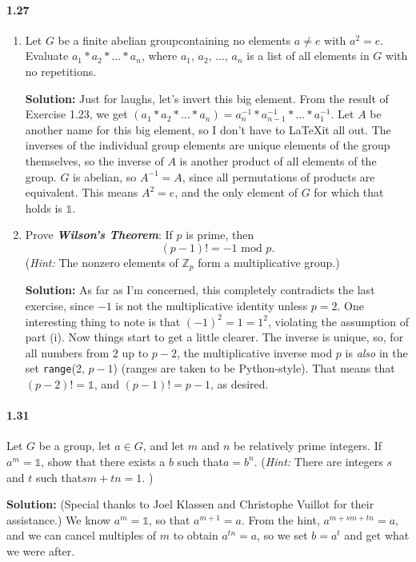 \documentclass[12pt,a4paper]{article}
\providecommand{\id}{\mathbb{1}}
\providecommand{\FAG}{finite abelian group}
\providecommand{\bemph}[1]{\emph{\textbf{#1}}}
\providecommand{\hint}{\emph{Hint: }}
\providecommand{\soln}{\textbf{Solution: }}
\providecommand{\st}{such that\xspace}
\providecommand{\JK}{Joel Klassen\xspace}
\providecommand{\CV}{Christophe Vuillot\xspace}
\providecommand{\inv}{^{-1}}
\providecommand{\mod}{\textrm{ mod }}
\begin{document}
\paragraph{1.27}
\begin{enumerate}[label=(\roman*)]
\item Let $G$ be a \FAG containing no elements $a \neq e$ with $a^2 = e$. 
Evaluate $a_1 \ast a_2 \ast \ldots \ast a_n$, where $a_1,\, a_2,\, \ldots, \, a_n$ is a list of all elements in $G$ with no repetitions.

\soln Just for laughs, let's invert this big element.
From the result of Exercise 1.23, we get $(a_1 \ast a_2 \ast \ldots \ast a_n) = a_n\inv \ast a_{n-1}\inv \ast \ldots \ast a_1\inv$.
Let $A$ be another name for this big element, so I don't have to \LaTeX it all out. 
The inverses of the individual group elements are unique elements of the group themselves, so the inverse of $A$ is another product of all elements of the group. 
$G$ is abelian, so $A\inv = A$, since all permutations of products are equivalent.
This means $A^2=e$, and the only element of $G$ for which that holds is $\id$.
\item Prove \bemph{Wilson's Theorem}: If $p$ is prime, then
\begin{equation*}
(p-1)! = -1 \mod p.
\end{equation*}
(\hint The nonzero elements of $\mathbb{Z}_p$ form a multiplicative group.)

\soln As far as I'm concerned, this completely contradicts the last exercise, since $-1$ is not the multiplicative identity unless $p=2$. 
One interesting thing to note is that $(-1)^2 = 1 = 1^2$, violating the assumption of part (i).
Now things start to get a little clearer. The inverse is unique, so, for all numbers from $2$ up to $p-2$, the multiplicative inverse mod $p$ is \emph{also} in the set \texttt{range}(2, $p-1$) (ranges are taken to be Python-style). 
That means that $(p-2)! = \id$, and $(p-1)! = p-1$, as desired.
\end{enumerate}

\paragraph*{1.31}
Let $G$ be a group, let $a \in G$, and let $m$ and $n$ be relatively prime integers. 
If $a^m=\id$, show that there exists a $b$ \st $a=b^n$. 
(\hint There are integers $s$ and $t$ \st $sm + tn = 1$. )

\soln (Special thanks to \JK and \CV for their assistance.) We know $a^m = \id$, so that $a^{m + 1} = a$. 
From the hint, $a^{m + sm + tn} = a$, and we can cancel multiples of $m$ to obtain $a^{tn} = a$, so we set $b = a^t$ and get what we were after.
\end{document}
